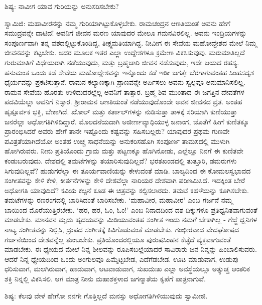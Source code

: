 ಶಿಷ್ಯ: ನಾವೀಗ ಯಾವ ಗುರಿಯನ್ನು ಅನುಸರಿಸಬೇಕು?

ಸ್ವಾಮಿಜಿ: ಮಹಾವೀರನನ್ನು ನಮ್ಮ ಗುರಿಯಾಗಿಟ್ಟುಕೊಳ್ಳಬೇಕು. ರಾಮಚಂದ್ರನ ಆಣತಿಯಂತೆ ಅವನು ಹೇಗೆ ಸಮುದ್ರವನ್ನೇ ದಾಟಿದ! ಅವನಿಗೆ ಜೀವನ ಮರಣ ಯಾವುದರ ಮೇಲೂ ಗಮನವಿರಲಿಲ್ಲ. ಅವನು ಇಂದ್ರಿಯಗಳನ್ನು ಸಂಪೂರ್ಣವಾಗಿ ತನ್ನ ವಶದಲ್ಲಿಟ್ಟುಕೊಂಡಿದ್ದ, ತೀಕ್ಷ್ಣಮತಿಯಾಗಿದ್ದ. ನೀವೀಗ ಈ ಸೇವೆಯ ಮಹೋದ್ದೇಶದ ಮೇಲೆ ನಿಮ್ಮ ಜೀವನವನ್ನು ಕಟ್ಟಬೇಕು. ಅದರ ಮೂಲಕ ಇತರ ಎಲ್ಲಾ ಉದ್ದೇಶಗಳೂ ಕ್ರಮೇಣ ವಿಕಸಿಸುವುವು. ಮರುಮಾತಿಲ್ಲದೆ ಗುರುಮಾತಿಗೆ ವಿಧೇಯರಾಗಿ ನಡೆಯುವುದು, ಮತ್ತು ಬ್ರಹ್ಮಚಾರಿ ಜೀವನ ನಡೆಸುವುದು, ಇದೇ ಜಯದ ರಹಸ್ಯ. ಹನುಮಂತ ಒಂದು ಕಡೆ ಸೇವೆಯ ಮಹೋದ್ದೇಶವನ್ನು ಇನ್ನೊಂದು ಕಡೆ ಇಡೀ ಜಗತ್ತೇ ಬೆರಗಾಗುವಂತಹ ಸಿಂಹಸದೃಶ ಧೈರ್ಯವನ್ನು ಪ್ರಕಟಿಸುತ್ತಾನೆ. ರಾಮನ ಕಲ್ಯಾಣಕ್ಕಾಗಿ ಪ್ರಾಣವನ್ನೇ ಅರ್ಪಿಸಲು ಅವನು ಸ್ವಲ್ಪವೂ ಅನುಮಾನಿಸಲಿಲ್ಲ. ರಾಮನ ಸೇವೆಯ ಹೊರತು ಉಳಿದುದರಲ್ಲೆಲ್ಲ ಅವನಿಗೆ ತಾತ್ಸಾರ. ಬ್ರಹ್ಮ ಶಿವ ಮುಂತಾದ ಈ ಜಗತ್ತಿನ ದೇವತೆಗಳ ಪದವಿಯೆಲ್ಲಾ ಅವನಿಗೆ ನಿಸ್ಸಾರ. ಶ‍್ರೀರಾಮನ ಆಣತಿಯಂತೆ ನಡೆಯುವುದೊಂದೇ ಅವನ ಜೀವನದ ವ್ರತ. ಅಂತಹ ಹೃತ್ಪೂರ್ವಕ ಭಕ್ತಿ, ಬೇಕಾಗಿದೆ. ಖೋಲ್ ಮತ್ತು ಕರ್ತಾಲ್‌ಗಳನ್ನು ನುಡಿಸುತ್ತಾ ತಾಳಕ್ಕೆ ಸರಿಯಾಗಿ ಕುಣಿಯುತ್ತಾ ಜನರೆಲ್ಲಾ ಅಧೋಗತಿಗಿಳಿದಿದ್ದಾರೆ. ಮೊಲದನೆಯದಾಗಿ ಅಜೀರ್ಣವ್ಯಾಧಿಯುಳ್ಳ ಜನಾಂಗ, ಜೊತೆಗೆ ಹೀಗೆ ಕುಣಿತಕ್ಕೂ ಪ್ರಾರಂಭಿಸಿದರೆ ಅವರು ಹೇಗೆ ತಾನೇ ಇಷ್ಟೊಂದು ಕಷ್ಟವನ್ನು ಸಹಿಸಬಲ್ಲರು? ಯಾವುದರ ಪ್ರಥಮ ಗುಣವೇ ಪವಿತ್ರತೆಯಾಗಿದೆಯೋ ಅಂತಹ ಉಚ್ಚ ಸಾಧನೆಯನ್ನು ಅನುಕರಿಸಹೊಗಿ ಸಂಪೂರ್ಣ ತಾಮಸದಲ್ಲಿ ಮುಳುಗಿ ಹೋಗಿರುವರು. ನೀನು ಪ್ರತಿಯೊಂದು ಗ್ರಾಮ ಮತ್ತು ಪಟ್ಟಣಕ್ಕೂ ಹೊಗಿನೋಡು, ಎಲ್ಲೆಲ್ಲೂ ನಿನಗೆ ಈ ಕುಣಿತವೇ ಕಂಡುಬರುವುದು. ದೇಶದಲ್ಲಿ ತಮಟೆಗಳನ್ನು ತಯಾರಿಸುವುದಿಲ್ಲವೆ? ಭರತಖಂಡದಲ್ಲಿ ತುತ್ತೂರಿ, ಡಮರುಗಳು ಸಿಗುವುದಿಲ್ಲವೆ? ಹುಡುಗರೆಲ್ಲಾ ಈ ತೂರ್ಯವಾಣಿಯನ್ನು ಕೇಳುವಂತೆ ಮಾಡಿ. ಬಾಲ್ಯದಿಂದ ಈ ಕೋಮಲಸ್ವಭಾವದ ಸಂಗೀತವನ್ನು ಕೇಳಿ ಕೇಳಿ, ಕೀರ್ತನೆಗಳನ್ನು ಕೇಳಿ ದೇಶವೆಲ್ಲಾ ನಾರಿಯರ ದೇಶವಾಗಿ ಪರಿಣಮಿಸಿದೆ. ಇದಕ್ಕಿಂತ ಬೇರೆ ಅಧೋಗತಿ ಯಾವುದಿದೆ? ಕವಿಯ ಕಲ್ಪನೆ ಕೂಡ ಈ ಚಿತ್ರವನ್ನು ಕಲ್ಪಿಸಲಾರದು. ತಮಟೆ ಕಹಳೆಯನ್ನು ಕೂಗಿಸಬೇಕು. ತಮಟೆಗಳನ್ನು ರಣರಂಗದಲ್ಲಿ ಬಾರಿಸಿದಂತೆ ಬಾರಿಸಬೇಕು. ‘ಮಹಾವೀರ, ಮಹಾವೀರ’ ಎಂಬ ಗರ್ಜನೆ ನಮ್ಮ ಬಾಯಿಂದ ಮೊರೆಯುತ್ತಿರಬೇಕು. ‘ಹರ, ಹರ, ಓಂ, ಓಂ!’ ಎಂಬ ನಿನಾದದಿಂದ ದಶ ದಿಕ್ಕುಗಳೂ ಪ್ರತಿಧ್ವನಿತವಾಗುವಂತೆ ಮಾಡಬೇಕು. ಮಾನವನ ಮೃದು ಹೃದಯವನ್ನು ಮಿಡಿಯುವಂತಹ ಸಂಗೀತ ಇಂದು ನಮಗೆ ಬೇಕಾಗಿಲ್ಲ - ಗೆಜ್ಜೆ ಧ್ವನಿಗಳ ನಾಟ್ಯ ಸಂಗೀತವನ್ನು ನಿಲ್ಲಿಸಿ, ದ್ರುಪದ ಸಂಗೀತಕ್ಕೆ ಕಿವಿಗೊಡುವಂತೆ ಮಾಡಬೇಕು. ಗಂಭೀರವಾದ ವೇದಘೋಷದ ಗರ್ಜನೆಯಿಂದ ದೇಶವನ್ನೆಲ್ಲ ತುಂಬಬೇಕು. ಪ್ರತಿಯೊಂದರಲ್ಲಿಯೂ ಪುರುಷಸಿಂಹನ ಕೆಚ್ಛೆದೆ ವ್ಯಕ್ತವಾಗುವಂತೆ ಮಾಡಬೇಕು. ಈ ಧ್ಯೇಯದ ಮೇಲೆ ನಿನ್ನ ಶೀಲವನ್ನು ರೂಪಿಸಬಲ್ಲೆಯಾದರೆ ಸಾವಿರಾರು ಜನ ನಿನ್ನನ್ನು ಹಿಂಬಾಲಿಸುವರು. ಆದರೆ ನಿನ್ನ ಧ್ಯೇಯದಿಂದ ಒಂದು ಅಂಗುಲವೂ ಹಿಮ್ಮೆಟ್ಟಬೇಡ, ಎದೆಗೆಡಬೇಡ. ಊಟ ಮಾಡುವಾಗ, ಉಡುಪು ಧರಿಸುವಾಗ, ಮಲಗಿರುವಾಗ, ಹಾಡುವಾಗ, ಆಟವಾಡುವಾಗ, ಸುಖದುಃಖ ಎಲ್ಲಾ ಅವಸ್ಥೆಯಲ್ಲೂ ಅತ್ಯುಚ್ಚ ಆಂತರಿಕ ಶಕ್ತಿ ನಿನ್ನಲ್ಲಿ ವಿಕಸಿಸಲಿ. ಆಗ ಮಾತ್ರ ನೀನು ಮಹಾಶಕ್ತಳಾದ ಜಗನ್ಮಾತೆಯ ಕೃಪೆಗೆ ಪಾತ್ರನಾಗುವೆ.

ಶಿಷ್ಯ: ಕೆಲವು ವೇಳೆ ಹೇಗೋ ನನಗೇ ಗೊತ್ತಿಲ್ಲದೆ ಮನಸ್ಸು ಅಧೋಗತಿಗಿಳಿಯುವುದು ಸ್ವಾಮೀಜಿ.

